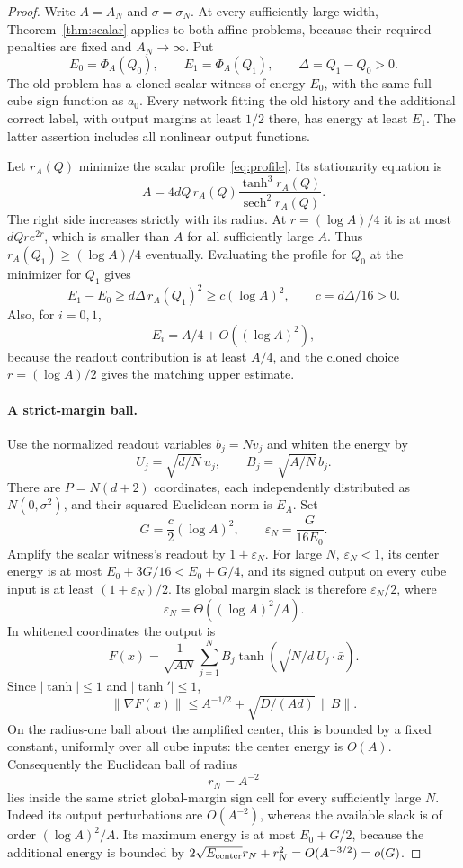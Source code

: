 \begin{proof}
Write $A=A_N$ and $\sigma=\sigma_N$. At every sufficiently large width,
Theorem~\ref{thm:scalar} applies to both affine problems, because their
required penalties are fixed and $A_N\to\infty$. Put
\[
 E_0=\Phi_A(Q_0),\qquad E_1=\Phi_A(Q_1),\qquad
 \Delta=Q_1-Q_0>0.
\]
The old problem has a cloned scalar witness of energy $E_0$, with the
same full-cube sign function as $a_0$. Every network fitting the old
history and the additional correct label, with output margins at least
$1/2$ there, has energy at least $E_1$. The latter assertion includes
all nonlinear output functions.

Let $r_A(Q)$ minimize the scalar profile~\eqref{eq:profile}. Its
stationarity equation is
\[
 A=4dQ\,r_A(Q)\frac{\tanh^3r_A(Q)}{\operatorname{sech}^2r_A(Q)}.
\]
The right side increases strictly with its radius. At
$r=(\log A)/4$ it is at most $dQr e^{2r}$, which is smaller than $A$
for all sufficiently large $A$. Thus $r_A(Q_1)\ge(\log A)/4$ eventually.
Evaluating the profile for $Q_0$ at the minimizer for $Q_1$ gives
\begin{equation}\label{post:gap}
 E_1-E_0\ge d\Delta\,r_A(Q_1)^2
 \ge c(\log A)^2,
 \qquad c=d\Delta/16>0.
\end{equation}
Also, for $i=0,1$,
\begin{equation}\label{post:baseline}
 E_i=A/4+O((\log A)^2),
\end{equation}
because the readout contribution is at least $A/4$, and the cloned
choice $r=(\log A)/2$ gives the matching upper estimate.

\paragraph{A strict-margin ball.}
Use the normalized readout variables $b_j=Nv_j$ and whiten the energy by
\[
 U_j=\sqrt{d/N}\,u_j,\qquad
 B_j=\sqrt{A/N}\,b_j.
\]
There are $P=N(d+2)$ coordinates, each independently distributed as
$N(0,\sigma^2)$, and their squared Euclidean norm is $E_A$.
Set
\[
 G=\frac c2(\log A)^2,\qquad
 \varepsilon_N=\frac{G}{16E_0}.
\]
Amplify the scalar witness's readout by $1+\varepsilon_N$.
For large $N$, $\varepsilon_N<1$, its center energy is at most
$E_0+3G/16<E_0+G/4$, and its signed output on every cube input is at
least $(1+\varepsilon_N)/2$. Its global margin slack is therefore
$\varepsilon_N/2$, where
\[
 \varepsilon_N=\Theta((\log A)^2/A).
\]
In whitened coordinates the output is
\[
 F(x)=\frac1{\sqrt{AN}}\sum_{j=1}^N
 B_j\tanh\!\left(\sqrt{N/d}\,U_j\cdot\bar x\right).
\]
Since $|\tanh|\le1$ and $|\tanh'|\le1$,
\[
 \|\nabla F(x)\|
 \le A^{-1/2}+\sqrt{D/(Ad)}\,\|B\|.
\]
On the radius-one ball about the amplified center, this is bounded by a
fixed constant, uniformly over all cube inputs: the center energy is
$O(A)$. Consequently the Euclidean ball of radius
\[
 r_N=A^{-2}
\]
lies inside the same strict global-margin sign cell for every sufficiently
large $N$. Indeed its output perturbations are $O(A^{-2})$, whereas the
available slack is of order $(\log A)^2/A$. Its maximum energy is at most
$E_0+G/2$, because the additional energy is bounded by
$2\sqrt{E_{\rm center}}r_N+r_N^2=O(A^{-3/2})=o(G)$.


\end{proof}
